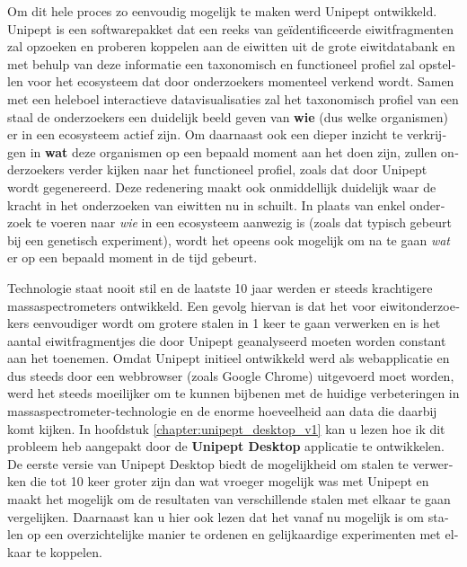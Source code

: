 \begin{otherlanguage}{dutch}
Om dit hele proces zo eenvoudig mogelijk te maken werd Unipept ontwikkeld.
Unipept is een softwarepakket dat een reeks van geïdentificeerde eiwitfragmenten zal opzoeken en proberen koppelen aan de eiwitten uit de grote eiwitdatabank en met behulp van deze informatie een taxonomisch en functioneel profiel zal opstellen voor het ecosysteem dat door onderzoekers momenteel verkend wordt.
Samen met een heleboel interactieve datavisualisaties zal het taxonomisch profiel van een staal de onderzoekers een duidelijk beeld geven van \textbf{wie} (dus welke organismen) er in een ecosysteem actief zijn.
Om daarnaast ook een dieper inzicht te verkrijgen in \textbf{wat} deze organismen op een bepaald moment aan het doen zijn, zullen onderzoekers verder kijken naar het functioneel profiel, zoals dat door Unipept wordt gegenereerd.
Deze redenering maakt ook onmiddellijk duidelijk waar de kracht in het onderzoeken van eiwitten nu in schuilt.
In plaats van enkel onderzoek te voeren naar \textit{wie} in een ecosysteem aanwezig is (zoals dat typisch gebeurt bij een genetisch experiment), wordt het opeens ook mogelijk om na te gaan \textit{wat} er op een bepaald moment in de tijd gebeurt.

Technologie staat nooit stil en de laatste 10 jaar werden er steeds krachtigere massaspectrometers ontwikkeld.
Een gevolg hiervan is dat het voor eiwitonderzoekers eenvoudiger wordt om grotere stalen in 1 keer te gaan verwerken en is het aantal eiwitfragmentjes die door Unipept geanalyseerd moeten worden constant aan het toenemen.
Omdat Unipept initieel ontwikkeld werd als webapplicatie en dus steeds door een webbrowser (zoals Google Chrome) uitgevoerd moet worden, werd het steeds moeilijker om te kunnen bijbenen met de huidige verbeteringen in massaspectrometer-technologie en de enorme hoeveelheid aan data die daarbij komt kijken.
In hoofdstuk \ref{chapter:unipept_desktop_v1} kan u lezen hoe ik dit probleem heb aangepakt door de \textbf{Unipept Desktop} applicatie te ontwikkelen.
De eerste versie van Unipept Desktop biedt de mogelijkheid om stalen te verwerken die tot 10 keer groter zijn dan wat vroeger mogelijk was met Unipept en maakt het mogelijk om de resultaten van verschillende stalen met elkaar te gaan vergelijken.
Daarnaast kan u hier ook lezen dat het vanaf nu mogelijk is om stalen op een overzichtelijke manier te ordenen en gelijkaardige experimenten met elkaar te koppelen.


\end{otherlanguage}
